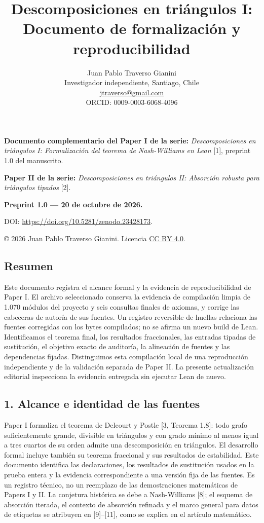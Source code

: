 \documentclass[spanish,11pt,a4paper]{article}
\title{Descomposiciones en triángulos I: Documento de formalización y reproducibilidad}
\author{Juan Pablo Traverso Gianini\\
\small Investigador independiente, Santiago, Chile\\
\small \href{mailto:jtraverso@gmail.com}{jtraverso@gmail.com}\\
\small ORCID: 0009-0003-6068-4096}
\date{}
\begin{document}
\raggedbottom
\maketitle
\textbf{Documento complementario del Paper I de la serie:} \emph{Descomposiciones en triángulos I: Formalización del teorema de Nash-Williams en Lean} {[}1{]}, preprint 1.0 del manuscrito.

\textbf{Paper II de la serie:} \emph{Descomposiciones en triángulos II: Absorción robusta para triángulos tipados} {[}2{]}.

\textbf{Preprint 1.0 --- 20 de octubre de 2026.}

DOI: \url{https://doi.org/10.5281/zenodo.23428173}.

© 2026 Juan Pablo Traverso Gianini. Licencia \href{https://creativecommons.org/licenses/by/4.0/}{CC BY 4.0}.

\subsection{Resumen}\label{resumen}

Este documento registra el alcance formal y la evidencia de reproducibilidad de Paper I. El archivo seleccionado conserva la evidencia de compilación limpia de 1.070 módulos del proyecto y seis consultas finales de axiomas, y corrige las cabeceras de autoría de sus fuentes. Un registro reversible de huellas relaciona las fuentes corregidas con los bytes compilados; no se afirma un nuevo build de Lean. Identificamos el teorema final, los resultados fraccionales, las entradas tipadas de sustitución, el objetivo exacto de auditoría, la alineación de fuentes y las dependencias fijadas. Distinguimos esta compilación local de una reproducción independiente y de la validación separada de Paper II. La presente actualización editorial inspecciona la evidencia entregada sin ejecutar Lean de nuevo.

\subsection{1. Alcance e identidad de las fuentes}\label{alcance-e-identidad-de-las-fuentes}

Paper I formaliza el teorema de Delcourt y Postle {[}3, Teorema 1.8{]}: todo grafo suficientemente grande, divisible en triángulos y con grado mínimo al menos igual a tres cuartos de su orden admite una descomposición en triángulos. El desarrollo formal incluye también su teorema fraccional y sus resultados de estabilidad. Este documento identifica las declaraciones, los resultados de sustitución usados en la prueba entera y la evidencia correspondiente a una versión fija de las fuentes. Es un registro técnico, no un reemplazo de las demostraciones matemáticas de Papers I y II. La conjetura histórica se debe a Nash-Williams {[}8{]}; el esquema de absorción iterada, el contexto de absorción refinada y el marco general para datos de etiquetas se atribuyen en {[}9{]}--{[}11{]}, como se explica en el artículo matemático.
\end{document}
